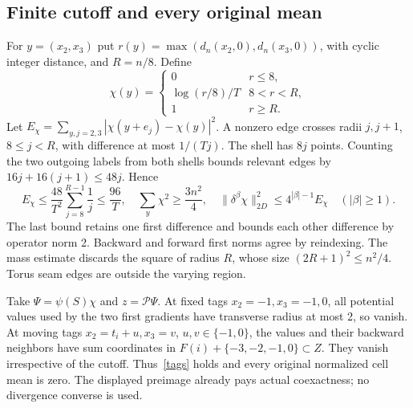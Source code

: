 \documentclass[11pt,a4paper]{article}
\newcommand{\norm}[1]{\lVert#1\rVert}
\begin{document}
\subsection{Finite cutoff and every original mean}
For $y=(x_2,x_3)$ put $r(y)=\max(d_n(x_2,0),d_n(x_3,0))$, with cyclic
integer distance, and $R=n/8$. Define
\[
 \chi(y)=\begin{cases}0&r\leq8,\\ \log(r/8)/T&8<r<R,\\1&r\geq R.
 \end{cases}
\]
Let $E_\chi=\sum_{y,j=2,3}|\chi(y+e_j)-\chi(y)|^2$. A nonzero edge
crosses radii $j,j+1$, $8\leq j<R$, with difference at most $1/(Tj)$.
The shell has $8j$ points. Counting the two outgoing labels from both shells
bounds relevant edges by $16j+16(j+1)\leq48j$. Hence
\begin{equation}\label{cap}
 E_\chi\leq\frac{48}{T^2}\sum_{j=8}^{R-1}\frac1j\leq\frac{96}{T},
 \quad \sum_y\chi^2\geq\frac{3n^2}{4},
 \quad\norm{\delta^\beta\chi}_{2D}^2\leq4^{|\beta|-1}E_\chi
 \quad(|\beta|\geq1).
\end{equation}
The last bound retains one first difference and bounds each other difference
by operator norm 2. Backward and forward first norms agree by reindexing.
The mass estimate discards the square of radius $R$, whose size
$(2R+1)^2\leq n^2/4$. Torus seam edges are outside the varying region.

Take $\Psi=\psi(S)\chi$ and $z=\mathcal P\Psi$. At fixed tags
$x_2=-1,x_3=-1,0$, all potential values used by the two first gradients have
transverse radius at most 2, so vanish. At moving tags
$x_2=t_i+u,x_3=v$, $u,v\in\{-1,0\}$, the values and their backward
neighbors have sum coordinates in $F(i)+\{-3,-2,-1,0\}\subset Z$.
They vanish irrespective of the cutoff. Thus~\eqref{tags} holds and every
original normalized cell mean is zero. The displayed preimage already pays
actual coexactness; no divergence converse is used.
\end{document}
